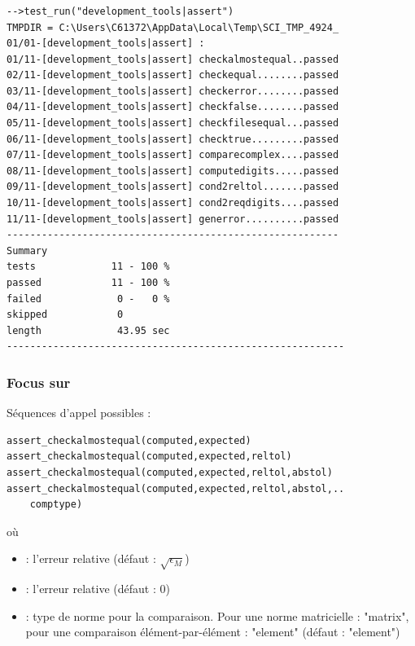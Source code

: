 \documentclass{beamer}
\begin{document}
\begin{frame}[containsverbatim]
\frametitle{}

\begin{lstlisting}
-->test_run("development_tools|assert")
TMPDIR = C:\Users\C61372\AppData\Local\Temp\SCI_TMP_4924_
01/01-[development_tools|assert] : 
01/11-[development_tools|assert] checkalmostequal..passed
02/11-[development_tools|assert] checkequal........passed
03/11-[development_tools|assert] checkerror........passed
04/11-[development_tools|assert] checkfalse........passed
05/11-[development_tools|assert] checkfilesequal...passed
06/11-[development_tools|assert] checktrue.........passed
07/11-[development_tools|assert] comparecomplex....passed
08/11-[development_tools|assert] computedigits.....passed
09/11-[development_tools|assert] cond2reltol.......passed
10/11-[development_tools|assert] cond2reqdigits....passed
11/11-[development_tools|assert] generror..........passed
---------------------------------------------------------
Summary
tests             11 - 100 %
passed            11 - 100 %
failed             0 -   0 %
skipped            0
length             43.95 sec
----------------------------------------------------------
\end{lstlisting}

\end{frame}

\begin{frame}[containsverbatim]
\frametitle{Focus sur }

Séquences d'appel possibles :
\begin{lstlisting}
assert_checkalmostequal(computed,expected)
assert_checkalmostequal(computed,expected,reltol)
assert_checkalmostequal(computed,expected,reltol,abstol)
assert_checkalmostequal(computed,expected,reltol,abstol,..
    comptype)
\end{lstlisting}
où
\begin{itemize}
\item {} : l'erreur relative (défaut : $\sqrt{\epsilon_M}$)
\item {} : l'erreur relative (défaut : 0)
\item {} : type de norme pour la comparaison. 
Pour une norme matricielle : "matrix", pour une 
comparaison élément-par-élément : "element" (défaut : "element")
\end{itemize}

\end{frame}
\end{document}
